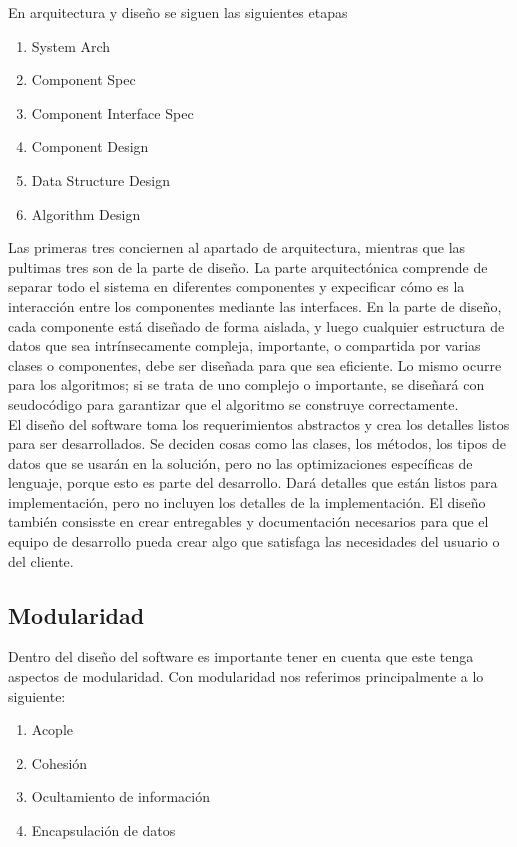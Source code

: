 En arquitectura y diseño se siguen las siguientes etapas

\begin{enumerate}
    \item System Arch
    \item Component Spec
    \item Component Interface Spec
    \item Component Design
    \item Data Structure Design
    \item Algorithm Design
\end{enumerate}

Las primeras tres conciernen al apartado de arquitectura, mientras que las pultimas tres son de la parte de diseño. La parte arquitectónica comprende de separar todo el sistema en diferentes componentes y expecificar cómo es la interacción entre los componentes mediante las interfaces. En la parte de diseño, cada componente está diseñado de forma aislada, y luego cualquier estructura de datos que sea intrínsecamente compleja, importante, o compartida por varias clases o componentes, debe ser diseñada para que sea eficiente. Lo mismo ocurre para los algoritmos; si se trata de uno complejo o importante, se diseñará con seudocódigo para garantizar que el algoritmo se construye correctamente. \\

El diseño del software toma los requerimientos abstractos y crea los detalles listos para ser desarrollados. Se deciden cosas como las clases, los métodos, los tipos de datos que se usarán en la solución, pero no las optimizaciones específicas de lenguaje, porque esto es parte del desarrollo. Dará detalles que están listos para implementación, pero no incluyen los detalles de la implementación. El diseño también consisste en crear entregables y documentación necesarios para que el equipo de desarrollo pueda crear algo que satisfaga las necesidades del usuario o del cliente. 

\subsection{Modularidad}

Dentro del diseño del software es importante tener en cuenta que este tenga aspectos de modularidad. Con modularidad nos referimos principalmente a lo siguiente:

\begin{enumerate}
    \item Acople
    \item Cohesión
    \item Ocultamiento de información
    \item Encapsulación de datos
\end{enumerate}

